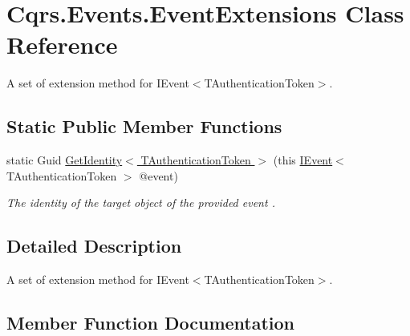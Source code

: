 \hypertarget{classCqrs_1_1Events_1_1EventExtensions}{}\section{Cqrs.\+Events.\+Event\+Extensions Class Reference}
\label{classCqrs_1_1Events_1_1EventExtensions}


A set of extension method for I\+Event$<$\+T\+Authentication\+Token$>$.  


\subsection*{Static Public Member Functions}
\begin{DoxyCompactItemize}
\item 
static Guid \hyperlink{classCqrs_1_1Events_1_1EventExtensions_a4d8611d80615275d1a7d0571bbee34cc_a4d8611d80615275d1a7d0571bbee34cc}{Get\+Identity$<$ T\+Authentication\+Token $>$} (this \hyperlink{interfaceCqrs_1_1Events_1_1IEvent}{I\+Event}$<$ T\+Authentication\+Token $>$ @event)
\begin{DoxyCompactList}\small\item\em The identity of the target object of the provided {\itshape event} . \end{DoxyCompactList}\end{DoxyCompactItemize}


\subsection{Detailed Description}
A set of extension method for I\+Event$<$\+T\+Authentication\+Token$>$. 



\subsection{Member Function Documentation}
\mbox{\label{classCqrs_1_1Events_1_1EventExtensions_a4d8611d80615275d1a7d0571bbee34cc_a4d8611d80615275d1a7d0571bbee34cc}} 
